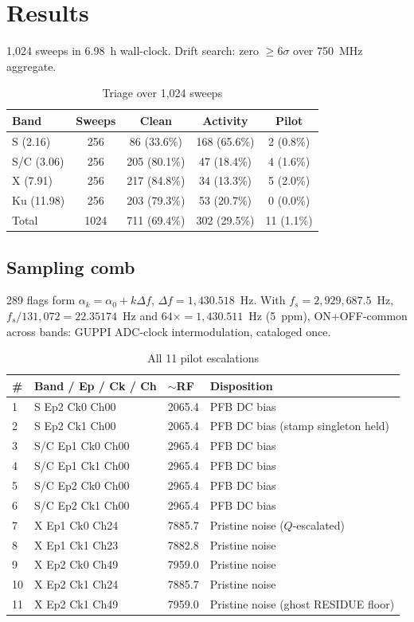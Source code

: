 \documentclass[twocolumn]{aastex631}
\begin{document}
\section{Results}
\label{sec:results}

1,024 sweeps in 6.98~h wall-clock. Drift search: zero $\ge6\sigma$ over 750~MHz aggregate.

\begin{table}[t]
\centering
\caption{Triage over 1,024 sweeps}
\label{tab:triage}
\begin{tabular}{lcccc}
\toprule
Band & Sweeps & Clean & Activity & Pilot \\
\midrule
S (2.16)   & 256 & 86 (33.6\%)  & 168 (65.6\%) & 2 (0.8\%) \\
S/C (3.06) & 256 & 205 (80.1\%) & 47 (18.4\%)  & 4 (1.6\%) \\
X (7.91)   & 256 & 217 (84.8\%) & 34 (13.3\%)  & 5 (2.0\%) \\
Ku (11.98) & 256 & 203 (79.3\%) & 53 (20.7\%)  & 0 (0.0\%) \\
\midrule
Total & 1024 & 711 (69.4\%) & 302 (29.5\%) & 11 (1.1\%) \\
\bottomrule
\end{tabular}
\end{table}

\subsection{Sampling comb}
289 flags form $\alpha_k=\alpha_0+k\Delta f$, $\Delta f=1{,}430.518$~Hz. With $f_s=2{,}929{,}687.5$~Hz, $f_s/131{,}072=22.35174$~Hz and $64\times=1{,}430.511$~Hz (5~ppm), ON+OFF-common across bands: GUPPI ADC-clock intermodulation, cataloged once.

\begin{table}[t]
\centering
\caption{All 11 pilot escalations}
\label{tab:cand}
\begin{tabular}{llll}
\toprule
\# & Band / Ep / Ck / Ch & $\sim$RF & Disposition \\
\midrule
1 & S Ep2 Ck0 Ch00 & 2065.4 & PFB DC bias \\
2 & S Ep2 Ck1 Ch00 & 2065.4 & PFB DC bias (stamp singleton held) \\
3 & S/C Ep1 Ck0 Ch00 & 2965.4 & PFB DC bias \\
4 & S/C Ep1 Ck1 Ch00 & 2965.4 & PFB DC bias \\
5 & S/C Ep2 Ck0 Ch00 & 2965.4 & PFB DC bias \\
6 & S/C Ep2 Ck1 Ch00 & 2965.4 & PFB DC bias \\
7 & X Ep1 Ck0 Ch24 & 7885.7 & Pristine noise ($Q$-escalated) \\
8 & X Ep1 Ck1 Ch23 & 7882.8 & Pristine noise \\
9 & X Ep2 Ck0 Ch49 & 7959.0 & Pristine noise \\
10 & X Ep2 Ck1 Ch24 & 7885.7 & Pristine noise \\
11 & X Ep2 Ck1 Ch49 & 7959.0 & Pristine noise (ghost RESIDUE floor) \\
\bottomrule
\end{tabular}
\end{table}
\end{document}

